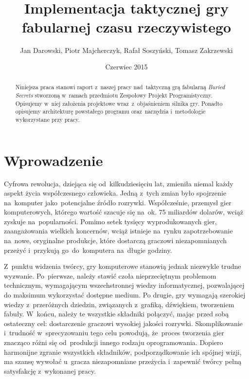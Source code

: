 \documentclass[licencjacka]{pracamgr}
\author	{Jan Darowski, Piotr Majcherczyk, Rafał Soszyński, Tomasz Zakrzewski}
\title{Implementacja taktycznej gry fabularnej czasu rzeczywistego}
\date{Czerwiec 2015}
\begin{document}
\maketitle

\begin{abstract}
  Niniejsza praca stanowi raport z~naszej pracy nad~taktyczną grą fabularną \emph{Buried Secrets} stworzoną w~ramach
  przedmiotu Zespołowy Projekt Programistyczny. Opisujemy w~niej założenia projektowe wraz~z~objaśnieniem silnika gry.
  Ponadto opisujemy architekturę powstałego programu oraz~narzędzia i~metodologie wykorzystane przy pracy.
\end{abstract}

\tableofcontents

\chapter*{Wprowadzenie}
  Cyfrowa rewolucja, dziejąca się od~kilkudziesięciu lat, zmieniła niemal każdy aspekt życia współczesnego człowieka.
  Jedną z~tych zmian było spojrzenie na~komputer jako~potencjalne źródło rozrywki. Współcześnie, przemysł gier
  komputerowych, którego wartość szacuje się na~ok. 75 miliardów dolarów\cite{CA}, wciąż zyskuje na~popularności.
  Pomimo setek tysięcy wyprodukowanych gier, zaangażowania wielkich koncernów, wciąż istnieje na~rynku zapotrzebowanie
  na~nowe, oryginalne produkcje, które dostarczą graczowi niezapomnianych przeżyć i~przykują go~do~komputera na~długie
  godziny.

  Z~punktu widzenia twórcy, gry komputerowe stanowią jednak niezwykle trudne wyzwanie. Po~pierwsze, należy stawić czoła
  nieprzeciętnym problemom technicznym, wymagającym wszechstronnej wiedzy informatycznej, pozwalającej do maksimum
  wykorzystać dostępne medium. Po drugie, gry wymagają szerokiej wiedzy z~przeróżnych dziedzin, związanych z~grafiką,
  dźwiękiem, tworzeniem fabuły. W~końcu, należy te wszystkie składniki połączyć, mając przed sobą ostateczny cel:
  dostarczenie graczowi wysokiej jakości rozrywki. Skomplikowanie i~trudność w~sprecyzowaniu tego celu powodują,
  że~proces tworzenia gier znacząco różni się od~produkcji innego rodzaju oprogramowania. Dopiero harmonijne zgranie
  wszystkich składników, podporządkowanie ich spójnej wizji, ma szansę wywołać u~gracza niezapomniane przeżycia
  i~zapewnić twórcy pełną satysfakcję z~wykonanej pracy.
\end{document}
